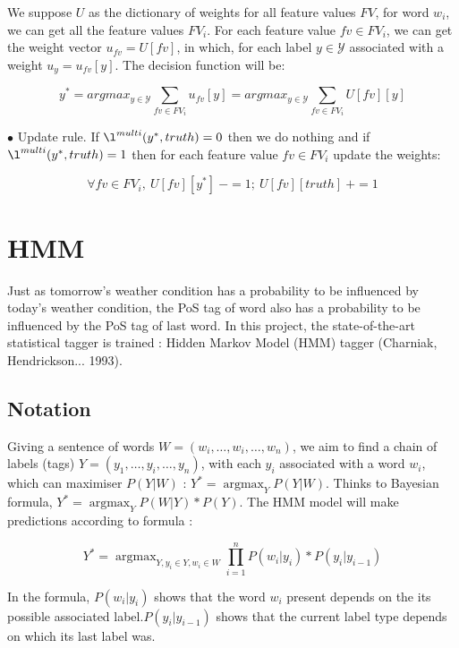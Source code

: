 \documentclass{article}
\def\YY{{\mathcal{Y}}}
\begin{document}
We suppose $U$ as the dictionary of weights for all feature values $FV$,  for word $w_i$, we can get all the feature values $FV_i$. For each feature value $fv \in FV_i$, we can get the weight vector $u_{fv} = U[fv]$, in which, for each label $y \in \YY$ associated with a weight $u_y = u_{fv} [y]$. The decision function will be:

\begin{equation}
y^* = argmax_{y \in \YY} \sum_{fv \in FV_i} {u_{fv}[y]}
= argmax_{y \in \YY} \sum_{fv \in FV_i} {U[fv][y]}
\end{equation}

$\bullet$ Update rule. If $\l^{multi}(y^*, truth) = 0$ then we do nothing and if $\l^{multi}(y^*, truth) = 1$ then for each feature value $fv \in FV_i$ update the weights:

\begin{equation}
\forall fv \in FV_i,\  U[fv][y^*]\ -= 1;\ U[fv][truth]\ += 1
\end{equation} 

\section{HMM}
Just as tomorrow's weather condition has a probability to be influenced by today's weather condition, the PoS tag of word also has a probability to be influenced by the PoS tag of last word. 
In this project, the state-of-the-art statistical tagger is trained : Hidden Markov Model (HMM) tagger (Charniak, Hendrickson... 1993).

\subsection{Notation}

Giving a sentence of words $W = (w_i,\dots,w_i,\dots,w_n)$, we aim to find a chain of labels (tags) $Y = (y_1,\dots,y_i,\dots,y_n)$, with each $y_i$ associated with a word $w_i$, which can maximiser $P(Y|W)$ : $Y^* = \mathop{\arg\max}_{Y} P(Y|W)$. Thinks to Bayesian formula, $Y^* = \mathop{\arg\max}_{Y} P(W|Y)*P(Y)$. The HMM model will make predictions according to formula :

\begin{equation}
Y^* = \mathop{\arg\max}_{Y, y_i \in Y, w_i \in W} \prod_{i=1}^n P(w_i|y_i)*P(y_i|y_{i-1})
\end{equation}

In the formula, $P(w_i|y_i)$ shows that the word $w_i$ present depends on the its possible associated label.$P(y_i|y_{i-1})$ shows that the current label type depends on which its last label was.
\end{document}
